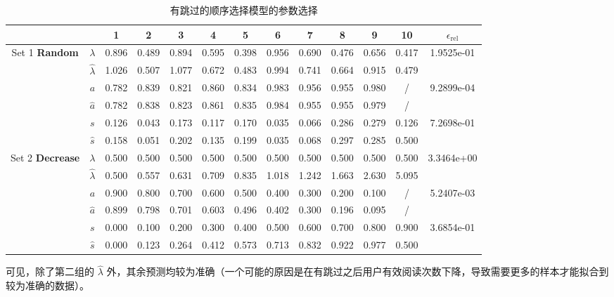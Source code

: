 \documentclass[UTF8]{ctexart}
\theoremstyle{plain}
\theoremstyle{definition}
\theoremstyle{remark}
\begin{document}
	\begin{table}[h!]
		\tiny
		\centering
		\label{tab:meituan-param}
		\begin{tabular}{cc|cccccccccc|c}
			\hline
			&                                         & 1 & 2 & 3 & 4 & 5 & 6 & 7 & 8 & 9 & 10 & $\epsilon_{\text{rel}}$\\
			\hline
			\multirow{4}{*}{Set 1 \textbf{Random}}
			& $\lambda$       & 0.896 & 0.489 & 0.894 & 0.595 & 0.398 & 0.956 & 0.690 & 0.476 & 0.656 & 0.417 & \multirow{2}{*}{1.9525e-01} \\
			& $\hat{\lambda}$ & 1.026 & 0.507 & 1.077 & 0.672 & 0.483 & 0.994 & 0.741 & 0.664 & 0.915 & 0.479 & \\
			& $a$             & 0.782 & 0.839 & 0.821 & 0.860 & 0.834 & 0.983 & 0.956 & 0.955 & 0.980 & \slash& \multirow{2}{*}{9.2899e-04} \\
			& $\hat{a}$       & 0.782 & 0.838 & 0.823 & 0.861 & 0.835 & 0.984 & 0.955 & 0.955 & 0.979 & \slash& \\
			& $s$             & 0.126 & 0.043 & 0.173 & 0.117 & 0.170 & 0.035 & 0.066 & 0.286 & 0.279 & 0.126 & \multirow{2}{*}{7.2698e-01} \\
			& $\hat{s}$       & 0.158 & 0.051 & 0.202 & 0.135 & 0.199 & 0.035 & 0.068 & 0.297 & 0.285 & 0.500 & \\
			\hline
			\multirow{4}{*}{Set 2 \textbf{Decrease}}
			& $\lambda$       & 0.500 & 0.500 & 0.500 & 0.500 & 0.500 & 0.500 & 0.500 & 0.500 & 0.500 & 0.500 & \multirow{2}{*}{3.3464e+00} \\
			& $\hat{\lambda}$ & 0.500 & 0.557 & 0.631 & 0.709 & 0.835 & 1.018 & 1.242 & 1.663 & 2.630 & 5.095 & \\
			& $a$             & 0.900 & 0.800 & 0.700 & 0.600 & 0.500 & 0.400 & 0.300 & 0.200 & 0.100 & \slash& \multirow{2}{*}{5.2407e-03} \\
			& $\hat{a}$       & 0.899 & 0.798 & 0.701 & 0.603 & 0.496 & 0.402 & 0.300 & 0.196 & 0.095 & \slash& \\
			& $s$             & 0.000 & 0.100 & 0.200 & 0.300 & 0.400 & 0.500 & 0.600 & 0.700 & 0.800 & 0.900 & \multirow{2}{*}{3.6854e-01} \\
			& $\hat{s}$       & 0.000 & 0.123 & 0.264 & 0.412 & 0.573 & 0.713 & 0.832 & 0.922 & 0.977 & 0.500 & \\
			\hline
		\end{tabular}
		\caption{有跳过的顺序选择模型的参数选择}
	\end{table}
	
	可见，除了第二组的 $\hat{\lambda}$ 外，其余预测均较为准确（一个可能的原因是在有跳过之后用户有效阅读次数下降，导致需要更多的样本才能拟合到较为准确的数据）。
	
\end{document}
